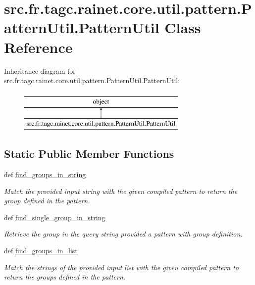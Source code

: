 \hypertarget{classsrc_1_1fr_1_1tagc_1_1rainet_1_1core_1_1util_1_1pattern_1_1PatternUtil_1_1PatternUtil}{\section{src.\-fr.\-tagc.\-rainet.\-core.\-util.\-pattern.\-Pattern\-Util.\-Pattern\-Util Class Reference}
\label{classsrc_1_1fr_1_1tagc_1_1rainet_1_1core_1_1util_1_1pattern_1_1PatternUtil_1_1PatternUtil}
}
Inheritance diagram for src.\-fr.\-tagc.\-rainet.\-core.\-util.\-pattern.\-Pattern\-Util.\-Pattern\-Util\-:\begin{figure}[H]
\begin{center}
\leavevmode
\includegraphics[height=2.000000cm]{classsrc_1_1fr_1_1tagc_1_1rainet_1_1core_1_1util_1_1pattern_1_1PatternUtil_1_1PatternUtil}
\end{center}
\end{figure}
\subsection*{Static Public Member Functions}
\begin{DoxyCompactItemize}
\item 
def \hyperlink{classsrc_1_1fr_1_1tagc_1_1rainet_1_1core_1_1util_1_1pattern_1_1PatternUtil_1_1PatternUtil_a3926c6b34baad7d386aa260b3b69eda3}{find\-\_\-groups\-\_\-in\-\_\-string}
\begin{DoxyCompactList}\small\item\em Match the provided input string with the given compiled pattern to return the group defined in the pattern. \end{DoxyCompactList}\item 
def \hyperlink{classsrc_1_1fr_1_1tagc_1_1rainet_1_1core_1_1util_1_1pattern_1_1PatternUtil_1_1PatternUtil_a55c373b2791c3f4c400a9ff6067ff9f8}{find\-\_\-single\-\_\-group\-\_\-in\-\_\-string}
\begin{DoxyCompactList}\small\item\em Retrieve the group in the query string provided a pattern with group definition. \end{DoxyCompactList}\item 
def \hyperlink{classsrc_1_1fr_1_1tagc_1_1rainet_1_1core_1_1util_1_1pattern_1_1PatternUtil_1_1PatternUtil_a235fb083ef75a2f97f62b790d9b3fe7b}{find\-\_\-groups\-\_\-in\-\_\-list}
\begin{DoxyCompactList}\small\item\em Match the strings of the provided input list with the given compiled pattern to return the groups defined in the pattern. \end{DoxyCompactList}\end{DoxyCompactItemize}


